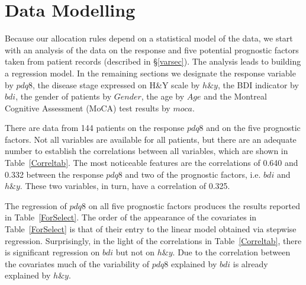 \documentclass[number,12pt,review]{elsarticle}
\begin{document}
\section{Data Modelling}

\label{datmodsec}

Because our allocation rules depend on a statistical model of the data, we start with an analysis of the data on the response and five potential prognostic factors taken from patient records (described in \S\ref{varsec}). The analysis leads to building a regression model. In the remaining sections we designate the response variable by $pdq8$, the disease stage expressed on H\&Y scale by $h\&y$, the BDI indicator by $bdi$, the gender of patients by $Gender$, the age by $Age$ and the Montreal Cognitive Assessment (MoCA) test \citep{nasreddine2005montreal} results by $moca$.

There are data from 144 patients on the response $pdq8$ and on the five prognostic factors. Not all variables are available for all patients, but there are an adequate number to establish the correlations between all variables, which are shown in Table~\ref{Correltab}. The most noticeable features are the correlations of 0.640 and 0.332 between the response $pdq8$ and two of the prognostic factors, i.e. $bdi$ and $h\&y$. These two variables, in turn, have a correlation of 0.325.

\begin{table}[ht]
\end{table}

The regression of $pdq8$ on all five prognostic factors produces the results reported in Table~\ref{ForSelect}.
The order of the appearance of the covariates in Table~\ref{ForSelect} is that of their entry to the linear model obtained via stepwise regression.
Surprisingly, in the light of the correlations in Table~\ref{Correltab}, there is significant regression on $bdi$ but not on $h\&y$. Due to the correlation between the covariates much of the variability of $pdq8$ explained by $bdi$ is already explained by $h\&y$.
\end{document}
